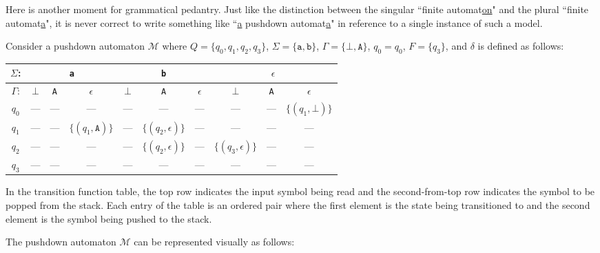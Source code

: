 \begin{remark}
Here is another moment for grammatical pedantry. Just like the distinction between the singular ``finite automat\underline{on}" and the plural ``finite automat\underline{a}", it is never correct to write something like ``\underline{a} pushdown automat\underline{a}" in reference to a single instance of such a model.
\end{remark}

\begin{example}
Consider a pushdown automaton $\mathcal{M}$ where $Q = \{q_{0}, q_{1}, q_{2}, q_{3}\}$, $\Sigma = \{\texttt{a}, \texttt{b}\}$, $\Gamma = \{\bot, \texttt{A}\}$, $q_{0} = q_{0}$, $F = \{q_{3}\}$, and $\delta$ is defined as follows:
\begin{center}
\small
\begin{tabular}{c | c c c | c c c | c c c}
$\Sigma$:		& \multicolumn{3}{c}{\texttt{a}}	& \multicolumn{3}{c}{\texttt{b}}	& \multicolumn{3}{c}{$\epsilon$} \\
\hline
$\Gamma$:	& $\bot$ 		& \texttt{A}	& $\epsilon$			& $\bot$ 		& \texttt{A}			& $\epsilon$	& $\bot$ 				& \texttt{A}	& $\epsilon$ \\
\hline
$q_{0}$		& ---			& ---			& ---					& ---			& ---					& ---			& ---					& ---			& $\{(q_{1}, \bot)\}$ \\
$q_{1}$		& ---			& ---			& $\{(q_{1}, \texttt{A})\}$	& ---			& $\{(q_{2}, \epsilon)\}$	& ---			& ---					& ---			& --- \\
$q_{2}$		& ---			& ---			& ---					& ---			& $\{(q_{2}, \epsilon)\}$	& ---			& $\{(q_{3}, \epsilon)\}$	& ---			& --- \\
$q_{3}$		& ---			& ---			& ---					& ---			& ---					& ---			& ---					& ---			& --- 
\end{tabular}
\end{center}
In the transition function table, the top row indicates the input symbol being read and the second-from-top row indicates the symbol to be popped from the stack. Each entry of the table is an ordered pair where the first element is the state being transitioned to and the second element is the symbol being pushed to the stack.

The pushdown automaton $\mathcal{M}$ can be represented visually as follows:
\begin{center}
\end{center}
\end{example}

